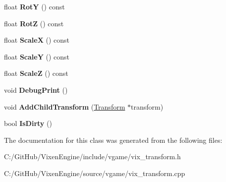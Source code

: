 \begin{DoxyCompactItemize}
\item 
\hypertarget{class_vixen_1_1_transform_acecfcfabfbda5bc8aac7a9e45f20cee4}{}float {\bfseries Rot\+Y} () const \label{class_vixen_1_1_transform_acecfcfabfbda5bc8aac7a9e45f20cee4}

\item 
\hypertarget{class_vixen_1_1_transform_a7df5bb3753741bef7ca8a7c791354347}{}float {\bfseries Rot\+Z} () const \label{class_vixen_1_1_transform_a7df5bb3753741bef7ca8a7c791354347}

\item 
\hypertarget{class_vixen_1_1_transform_af716ad9a5c82179879fe924675f134d9}{}float {\bfseries Scale\+X} () const \label{class_vixen_1_1_transform_af716ad9a5c82179879fe924675f134d9}

\item 
\hypertarget{class_vixen_1_1_transform_a3f0fb85fc59c8e8b79fe6cdc567e827c}{}float {\bfseries Scale\+Y} () const \label{class_vixen_1_1_transform_a3f0fb85fc59c8e8b79fe6cdc567e827c}

\item 
\hypertarget{class_vixen_1_1_transform_a983a7d2c79b4d224ccfb16e5b60fbbab}{}float {\bfseries Scale\+Z} () const \label{class_vixen_1_1_transform_a983a7d2c79b4d224ccfb16e5b60fbbab}

\item 
\hypertarget{class_vixen_1_1_transform_ad2402338315c6e593d5b4022d31de95b}{}void {\bfseries Debug\+Print} ()\label{class_vixen_1_1_transform_ad2402338315c6e593d5b4022d31de95b}

\item 
\hypertarget{class_vixen_1_1_transform_a50f59ce9590df186218298298dc00aee}{}void {\bfseries Add\+Child\+Transform} (\hyperlink{class_vixen_1_1_transform}{Transform} $\ast$transform)\label{class_vixen_1_1_transform_a50f59ce9590df186218298298dc00aee}

\item 
\hypertarget{class_vixen_1_1_transform_ac3902f9ca4d7abb89417a608ba83766c}{}bool {\bfseries Is\+Dirty} ()\label{class_vixen_1_1_transform_ac3902f9ca4d7abb89417a608ba83766c}

\end{DoxyCompactItemize}


The documentation for this class was generated from the following files\+:\begin{DoxyCompactItemize}
\item 
C\+:/\+Git\+Hub/\+Vixen\+Engine/include/vgame/vix\+\_\+transform.\+h\item 
C\+:/\+Git\+Hub/\+Vixen\+Engine/source/vgame/vix\+\_\+transform.\+cpp\end{DoxyCompactItemize}
